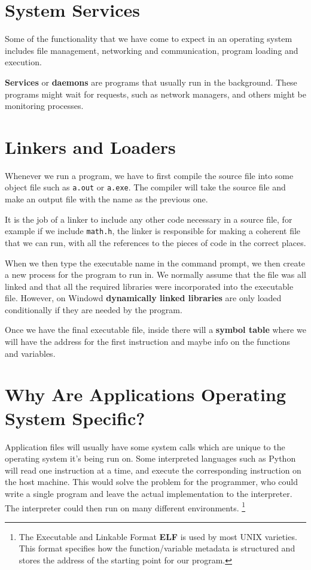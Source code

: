 \documentclass{tufte-handout}
\begin{document}
\section{System Services}
Some of the functionality that we have come to expect in an operating system includes
file management, networking and communication, program loading and execution.

\textbf{Services} or \textbf{daemons} are programs that usually run in the background.
These programs might wait for requests, such as network managers, and others might 
be monitoring processes.

\section{Linkers and Loaders}
Whenever we run a program, we have to first compile the source file into some object 
file such as \texttt{a.out} or \texttt{a.exe}. The compiler will take the source 
file and make an output file with the name as the previous one.

It is the job of a linker to include any other code necessary in a source file,
for example if we include \texttt{math.h}, the linker is responsible for making 
a coherent file that we can run, with all the references to the pieces of code 
in the correct places. 

When we then type the executable name in the command prompt, we then create a new 
process for the program to run in. We normally assume that the file was all linked
and that all the required libraries were incorporated into the executable file. 
However, on Windowd \textbf{dynamically linked libraries} are only loaded conditionally
if they are needed by the program.

Once we have the final executable file, inside there will a \textbf{symbol table} where
we will have the address for the first instruction and maybe info on the functions
and variables.

\section{Why Are Applications Operating System Specific?}

Application files will usually have some system calls which are unique to the operating
system it's being run on. Some interpreted languages such as Python will read one
instruction at a time, and execute the corresponding instruction on the host machine. 
This would solve the problem for the programmer, who could write a single program
and leave the actual implementation to the interpreter. The interpreter could then 
run on many different environments. 
\footnote{The Executable and Linkable Format \textbf{ELF} is used by most UNIX 
varieties. This format specifies how the function/variable metadata is structured
and stores the address of the starting point for our program.}
\end{document}

